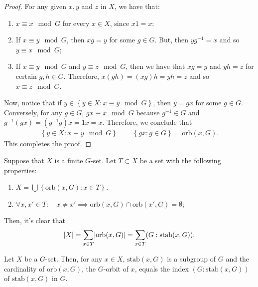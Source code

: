 \begin{proof}
  For any given \(x,y\) and \(z\) in \(X\), we have that:
  \begin{enumerate}
    \item
      \(x\equiv{x}\mod{G}\) for every \(x\in{X}\), since \(x1=x\);
    \item
      If \(x\equiv{y}\mod{G}\), then \(xg=y\) for some \(g\in{G}\). But, then
      \(yg^{-1}=x\) and so \(y\equiv{x}\mod{G}\);
    \item
      If \(x\equiv{y}\mod{G}\) and \(y\equiv{z}\mod{G}\), then we have that
      \(xg=y\) and \(yh=z\) for certain \(g,h\in{G}\). Therefore,
      \(x(gh)=(xg)h=yh=z\) and so \(x\equiv{z}\mod{G}\).
  \end{enumerate}
  Now, notice that if \(y\in\left\{y\in{X}:x\equiv{y}\mod{G}\right\}\), then
  \(y=gx\) for some \(g\in{G}\). Conversely, for any \(g\in{G}\),
  \(gx\equiv{x}\mod{G}\) because \(g^{-1}\in{G}\) and
  \(g^{-1}(gx)=(g^{-1}g)x=1x=x\). Therefore, we conclude that
  \begin{align*}
    \left\{y\in{X}:x\equiv{y}\mod{G}\right\}
    &=
    \left\{gx:g\in{G}\right\}
    =\text{orb}(x,G).
  \end{align*}
  This completes the proof.
\end{proof}

Suppose that \(X\) is a finite \(G\)-set. Let \(T\subset{X}\) be a set with the
following properties:
\begin{enumerate}
  \item
    \(X=\bigcup\left\{\text{orb}(x,G):x\in{T}\right\}\).
  \item
    \(\forall{x,x'\in{T}}:\quad{x\neq{x'}}\implies{\text{orb}(x,G)\cap{\text{orb}(x',G)}}=\emptyset\);
\end{enumerate}
Then, it's clear that
\begin{equation}\label{eq:numeric-characteristic}
  \lvert X\rvert=\sum\limits_{x\in{T}}\lvert\text{orb}(x,G)\rvert=\sum\limits_{x\in{T}}(G:\text{stab}(x,G)).
\end{equation}

\begin{proposition}\label{prop:cardinality-of-orbits}
  Let \(X\) be a \(G\)-set. Then, for any \(x\in{X}\), \(\text{stab}(x,G)\) is a subgroup
  of \(G\) and the cardinality of \(\text{orb}(x,G)\), the \(G\)-orbit of \(x\), equals the
  index \((G:\text{stab}(x,G))\) of \(\text{stab}(x,G)\) in \(G\).
\end{proposition}

